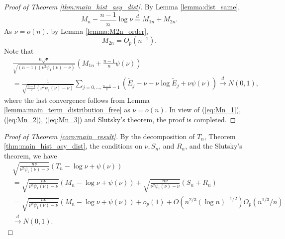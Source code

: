 \documentclass[12pt,letterpaper, twoside, openany]{article}
\theoremstyle{plain}
\begin{document}
\begin{proof}[Proof of Theorem \ref{thm:main_hist_asy_dist}]
	By Lemma \ref{lemma:dist_same},
	\begin{equation}\label{eq:Mn_1}
		M_n - \frac{n-1}{n}\log \nu \stackrel{d}{=} M_{1n} + M_{2n}.
	\end{equation}
As $\nu = o(n)$, by Lemma \ref{lemma:M2n_order},
	\begin{equation}\label{eq:Mn_2}
		M_{2n} = O_p(n^{-1}).
	\end{equation}
	Note that
	\begin{align}
		&		\frac{n\sqrt{\nu}}{\sqrt{(n-1)(\nu^2 \psi_1(\nu) - \nu)}}\left( M_{1n} + \frac{n-1}{n} \psi(\nu) \right) \nonumber \\
		&=		\frac{1}{\sqrt{\frac{n-1}{\nu} (\nu^2 \psi_1(\nu) - \nu)}} \sum_{j=0,\ldots, \frac{n-1}{\nu}-1}(\tilde{E}_j - \nu - \nu \log \tilde{E}_j + \nu\psi(\nu)) \stackrel{d}{\rightarrow} N(0, 1), \label{eq:Mn_3}
	\end{align}
	where the last convergence follows from Lemma \ref{lemma:main_term_distribution_free} as $\nu = o(n)$.
	In view of (\ref{eq:Mn_1}), (\ref{eq:Mn_2}), (\ref{eq:Mn_3}) and Slutsky's theorem, the proof is completed.
\end{proof}

\begin{proof}[Proof of Theorem \ref{coro:main_result}]
By the decomposition of $T_n$, Theorem \ref{thm:main_hist_asy_dist}, the conditions on $\nu, S_n$, and $R_n$, and the Slutsky's theorem, we have
\begin{align*}
&\sqrt{ \frac{n\nu}{\nu^2\psi_1(\nu)-\nu}} \left( T_n -  \log \nu +  \psi(\nu) \right) \\
&=\sqrt{ \frac{n\nu}{\nu^2\psi_1(\nu)-\nu}} \left( M_n -  \log \nu +  \psi(\nu) \right) +  \sqrt{ \frac{n\nu}{\nu^2\psi_1(\nu)-\nu}}(S_n + R_n)\\
&= \sqrt{ \frac{n\nu}{\nu^2\psi_1(\nu)-\nu}} \left( M_n -  \log \nu +  \psi(\nu) \right) + o_p(1) + O(n^{2/3} (\log n)^{-1/2}) O_p(n^{1/3} / n)\\
& \stackrel{d}{\rightarrow} N(0, 1).
\end{align*}

\end{proof}
\end{document}

